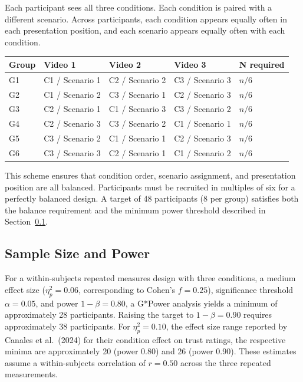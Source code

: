 \documentclass[11pt, a4paper]{article}
\begin{document}
Each participant sees all three conditions. Each condition is paired with a different scenario. Across participants, each condition appears equally often in each presentation position, and each scenario appears equally often with each condition.

\begin{center}
\begin{tabular}{@{}lllll@{}}
\toprule
\textbf{Group} & \textbf{Video 1} & \textbf{Video 2} & \textbf{Video 3} & \textbf{N required} \\
\midrule
G1 & C1 / Scenario 1 & C2 / Scenario 2 & C3 / Scenario 3 & $n/6$ \\
G2 & C1 / Scenario 2 & C3 / Scenario 1 & C2 / Scenario 3 & $n/6$ \\
G3 & C2 / Scenario 1 & C1 / Scenario 3 & C3 / Scenario 2 & $n/6$ \\
G4 & C2 / Scenario 3 & C3 / Scenario 2 & C1 / Scenario 1 & $n/6$ \\
G5 & C3 / Scenario 2 & C1 / Scenario 1 & C2 / Scenario 3 & $n/6$ \\
G6 & C3 / Scenario 3 & C2 / Scenario 1 & C1 / Scenario 2 & $n/6$ \\
\bottomrule
\end{tabular}
\end{center}

This scheme ensures that condition order, scenario assignment, and presentation position are all balanced. Participants must be recruited in multiples of six for a perfectly balanced design. A target of 48 participants (8 per group) satisfies both the balance requirement and the minimum power threshold described in Section~\ref{sec:samplesize}.

\subsection{Sample Size and Power}
\label{sec:samplesize}

For a within-subjects repeated measures design with three conditions, a medium effect size ($\eta^2_p = 0.06$, corresponding to Cohen's $f = 0.25$), significance threshold $\alpha = 0.05$, and power $1 - \beta = 0.80$, a G*Power analysis yields a minimum of approximately 28 participants. Raising the target to $1 - \beta = 0.90$ requires approximately 38 participants. For $\eta^2_p = 0.10$, the effect size range reported by Canales et al.\ (2024) for their condition effect on trust ratings, the respective minima are approximately 20 (power 0.80) and 26 (power 0.90). These estimates assume a within-subjects correlation of $r = 0.50$ across the three repeated measurements.
\end{document}
